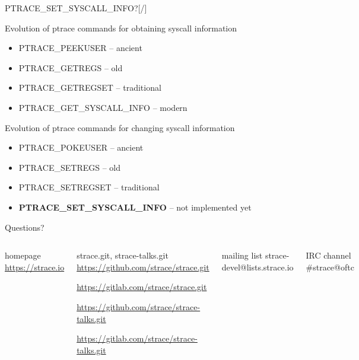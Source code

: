 \documentclass[unicode,aspectratio=169,xcolor={table,dvipsnames,usernames}]{beamer}
\begin{document}
\begin{frame}{\Large PTRACE\_SET\_SYSCALL\_INFO?\hfill [\insertframenumber/\inserttotalframenumber]}
\Large
\begin{block}{Evolution of ptrace commands for obtaining syscall information}
\begin{itemize}
	\item PTRACE\_PEEKUSER -- ancient
	\item PTRACE\_GETREGS -- old
	\item PTRACE\_GETREGSET -- traditional
	\item PTRACE\_GET\_SYSCALL\_INFO -- modern
\end{itemize}
\end{block}

\begin{block}{Evolution of ptrace commands for changing syscall information}
\begin{itemize}
	\item PTRACE\_POKEUSER -- ancient
	\item PTRACE\_SETREGS -- old
	\item PTRACE\_SETREGSET -- traditional
	\item \textbf{PTRACE\_SET\_SYSCALL\_INFO} -- not implemented yet
\end{itemize}
\end{block}
\end{frame}

{
\begin{frame}[noframenumbering]{Questions?}
	\begin{columns}
		\column{9cm}
\begin{block}{\large homepage}
	\url{https://strace.io}
\end{block}
\begin{block}{\large strace.git, strace-talks.git}
	\url{https://github.com/strace/strace.git}

	\url{https://gitlab.com/strace/strace.git}

\smallskip

	\url{https://github.com/strace/strace-talks.git}

	\url{https://gitlab.com/strace/strace-talks.git}
\end{block}
\begin{block}{\large mailing list}
	strace-devel@lists.strace.io
\end{block}
\begin{block}{\large IRC channel}
	\#strace@oftc
\end{block}
		\column{3cm}
			\centerline{}
	\end{columns}
\end{frame}
}
\end{document}
